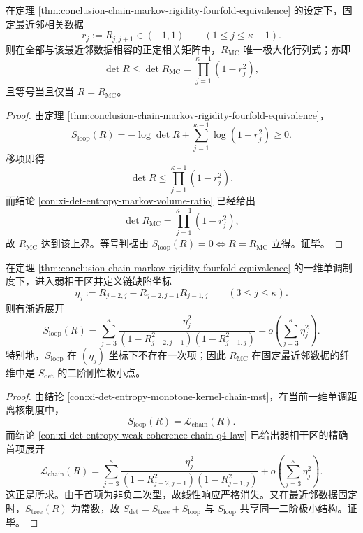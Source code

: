 \begin{theorem}[固定最近邻数据下的行列式极大化]\label{thm:conclusion-chain-markov-determinant-maximization-fixed-nearest-neighbor}
在定理 \ref{thm:conclusion-chain-markov-rigidity-fourfold-equivalence} 的设定下，固定最近邻相关数据
\[
r_j:=R_{j,j+1}\in(-1,1)
\qquad (1\le j\le \kappa-1).
\]
则在全部与该最近邻数据相容的正定相关矩阵中，\(R_{\mathrm{MC}}\) 唯一极大化行列式；亦即
\[
\det R\le \det R_{\mathrm{MC}}
=\prod_{j=1}^{\kappa-1}(1-r_j^2),
\]
且等号当且仅当 \(R=R_{\mathrm{MC}}\)。
\end{theorem}
\begin{proof}
由定理 \ref{thm:conclusion-chain-markov-rigidity-fourfold-equivalence}，
\[
S_{\mathrm{loop}}(R)
=
-\log\det R+\sum_{j=1}^{\kappa-1}\log(1-r_j^2)
\ge 0.
\]
移项即得
\[
\det R\le \prod_{j=1}^{\kappa-1}(1-r_j^2).
\]
而结论 \ref{con:xi-det-entropy-markov-volume-ratio} 已经给出
\[
\det R_{\mathrm{MC}}=\prod_{j=1}^{\kappa-1}(1-r_j^2),
\]
故 \(R_{\mathrm{MC}}\) 达到该上界。等号判据由 \(S_{\mathrm{loop}}(R)=0\iff R=R_{\mathrm{MC}}\) 立得。证毕。
\end{proof}

\begin{theorem}[二次缺陷坐标下的无一次响应]\label{thm:conclusion-chain-defect-coordinates-no-linear-response}
在定理 \ref{thm:conclusion-chain-markov-rigidity-fourfold-equivalence} 的一维单调制度下，进入弱相干区并定义链缺陷坐标
\[
\eta_j:=R_{j-2,j}-R_{j-2,j-1}R_{j-1,j}
\qquad (3\le j\le \kappa).
\]
则有渐近展开
\[
S_{\mathrm{loop}}(R)
=
\sum_{j=3}^{\kappa}
\frac{\eta_j^2}{(1-R_{j-2,j-1}^2)(1-R_{j-1,j}^2)}
+o\!\left(\sum_{j=3}^{\kappa}\eta_j^2\right).
\]
特别地，\(S_{\mathrm{loop}}\) 在 \((\eta_j)\) 坐标下不存在一次项；因此 \(R_{\mathrm{MC}}\) 在固定最近邻数据的纤维中是 \(S_{\det}\) 的二阶刚性极小点。
\end{theorem}
\begin{proof}
由结论 \ref{con:xi-det-entropy-monotone-kernel-chain-mst}，在当前一维单调距离核制度中，
\[
S_{\mathrm{loop}}(R)=\mathcal L_{\mathrm{chain}}(R).
\]
而结论 \ref{con:xi-det-entropy-weak-coherence-chain-q4-law} 已给出弱相干区的精确首项展开
\[
\mathcal L_{\mathrm{chain}}(R)
=
\sum_{j=3}^{\kappa}
\frac{\eta_j^2}{(1-R_{j-2,j-1}^2)(1-R_{j-1,j}^2)}
+o\!\left(\sum_{j=3}^{\kappa}\eta_j^2\right).
\]
这正是所求。由于首项为非负二次型，故线性响应严格消失。又在最近邻数据固定时，\(S_{\mathrm{tree}}(R)\) 为常数，故 \(S_{\det}=S_{\mathrm{tree}}+S_{\mathrm{loop}}\) 与 \(S_{\mathrm{loop}}\) 共享同一二阶极小结构。证毕。
\end{proof}

